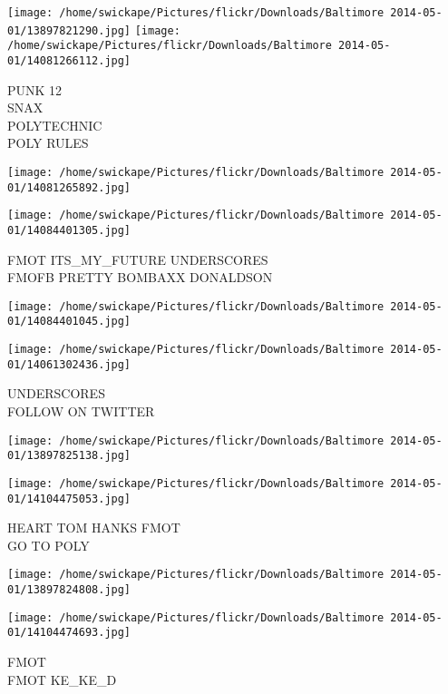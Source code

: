 \documentclass[10pt,letterpaper]{article}
\begin{document}
\texttt{[image: /home/swickape/Pictures/flickr/Downloads/Baltimore 2014-05-01/13897821290.jpg]}
\texttt{[image: /home/swickape/Pictures/flickr/Downloads/Baltimore 2014-05-01/14081266112.jpg]}

PUNK 12\\
SNAX\\
POLYTECHNIC\\
POLY RULES\\
\pagebreak

\texttt{[image: /home/swickape/Pictures/flickr/Downloads/Baltimore 2014-05-01/14081265892.jpg]}

\vspace{0.25in}
\texttt{[image: /home/swickape/Pictures/flickr/Downloads/Baltimore 2014-05-01/14084401305.jpg]}

FMOT ITS\_MY\_FUTURE UNDERSCORES\\
FMOFB PRETTY BOMBAXX DONALDSON\\
\pagebreak

\texttt{[image: /home/swickape/Pictures/flickr/Downloads/Baltimore 2014-05-01/14084401045.jpg]}

\vspace{0.25in}
\texttt{[image: /home/swickape/Pictures/flickr/Downloads/Baltimore 2014-05-01/14061302436.jpg]}

UNDERSCORES\\
FOLLOW ON TWITTER\\
\pagebreak

\texttt{[image: /home/swickape/Pictures/flickr/Downloads/Baltimore 2014-05-01/13897825138.jpg]}

\vspace{0.25in}
\texttt{[image: /home/swickape/Pictures/flickr/Downloads/Baltimore 2014-05-01/14104475053.jpg]}

HEART TOM HANKS FMOT\\
GO TO POLY\\
\pagebreak

\texttt{[image: /home/swickape/Pictures/flickr/Downloads/Baltimore 2014-05-01/13897824808.jpg]}

\vspace{0.25in}
\texttt{[image: /home/swickape/Pictures/flickr/Downloads/Baltimore 2014-05-01/14104474693.jpg]}

FMOT\\
FMOT KE\_KE\_D\\
\pagebreak
\end{document}
